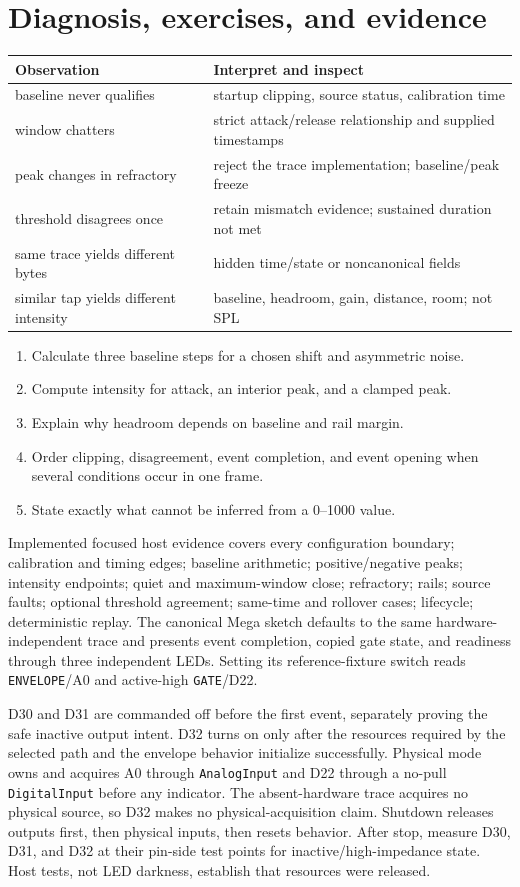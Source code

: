 \documentclass[11pt]{article}
\begin{document}
\section{Diagnosis, exercises, and evidence}
\begin{tabularx}{\linewidth}{@{}X X@{}}
\toprule
Observation & Interpret and inspect\\
\midrule
baseline never qualifies & startup clipping, source status, calibration time\\
window chatters & strict attack/release relationship and supplied timestamps\\
peak changes in refractory & reject the trace implementation; baseline/peak freeze\\
threshold disagrees once & retain mismatch evidence; sustained duration not met\\
same trace yields different bytes & hidden time/state or noncanonical fields\\
similar tap yields different intensity & baseline, headroom, gain, distance, room; not SPL\\
\bottomrule
\end{tabularx}
\begin{enumerate}
 \item Calculate three baseline steps for a chosen shift and asymmetric noise.
 \item Compute intensity for attack, an interior peak, and a clamped peak.
 \item Explain why headroom depends on baseline and rail margin.
 \item Order clipping, disagreement, event completion, and event opening when
       several conditions occur in one frame.
 \item State exactly what cannot be inferred from a 0--1000 value.
\end{enumerate}

Implemented focused host evidence covers every configuration boundary;
calibration and timing
edges; baseline arithmetic; positive/negative peaks; intensity endpoints;
quiet and maximum-window close; refractory; rails; source faults; optional
threshold agreement; same-time and rollover cases; lifecycle; deterministic
replay. The canonical Mega sketch defaults to the same hardware-independent
trace and presents event completion, copied gate state, and readiness through
three independent LEDs. Setting its reference-fixture switch reads
\texttt{ENVELOPE}/A0 and active-high \texttt{GATE}/D22.

D30 and D31 are commanded off before the first event, separately proving the
safe inactive output intent. D32 turns on only after the resources required by
the selected path and the envelope behavior initialize successfully. Physical
mode owns and acquires A0 through \texttt{AnalogInput} and D22 through a
no-pull \texttt{DigitalInput} before any indicator. The absent-hardware trace
acquires no physical source, so D32 makes no physical-acquisition claim.
Shutdown releases outputs first, then physical inputs, then resets behavior.
After stop, measure D30, D31, and D32 at their pin-side test points for
inactive/high-impedance state. Host tests, not LED darkness, establish that
resources were released.
\end{document}
